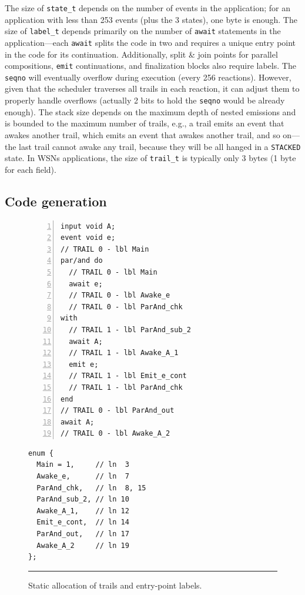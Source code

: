 \documentclass{sigplanconf}
\newcommand{\code}[1] {{\small{\texttt{#1}}}}
\newcommand{\1}{\;}
\newcommand{\2}{\;\;}
\newcommand{\3}{\;\;\;}
\newcommand{\5}{\;\;\;\;\;}
\begin{document}
The size of \code{state\_t} depends on the number of events in the application;
for an application with less than 253 events (plus the 3 states), one byte is 
enough.
%
The size of \code{label\_t} depends primarily on the number of \code{await} 
statements in the application---each \code{await} splits the code in two and 
requires a unique entry point in the code for its continuation.
Additionally, split \& join points for parallel compositions, \code{emit} 
continuations, and finalization blocks also require labels.
%
The \code{seqno} will eventually overflow during execution (every 256 
reactions).
However, given that the scheduler traverses all trails in each reaction, it can 
adjust them to properly handle overflows (actually 2 bits to hold the 
\code{seqno} would be already enough).
%
The stack size depends on the maximum depth of nested emissions and is bounded 
to the maximum number of trails, e.g., a trail emits an event that awakes 
another trail, which emits an event that awakes another trail, and so on---the 
last trail cannot awake any trail, because they will be all hanged in a 
\code{STACKED} state.
%
In WSNs applications, the size of \code{trail\_t} is typically only 3 bytes (1 
byte for each field).

\subsection{Code generation}

\begin{figure}[t]
\begin{minipage}[t]{0.55\linewidth}
\begin{lstlisting}[numbers=left,xleftmargin=2em]
input void A;
event void e;
// TRAIL 0 - lbl Main
par/and do
  // TRAIL 0 - lbl Main
  await e;
  // TRAIL 0 - lbl Awake_e
  // TRAIL 0 - lbl ParAnd_chk
with
  // TRAIL 1 - lbl ParAnd_sub_2
  await A;
  // TRAIL 1 - lbl Awake_A_1
  emit e;
  // TRAIL 1 - lbl Emit_e_cont
  // TRAIL 1 - lbl ParAnd_chk
end
// TRAIL 0 - lbl ParAnd_out
await A;
// TRAIL 0 - lbl Awake_A_2
\end{lstlisting}
\end{minipage}
%
\begin{minipage}[t]{0.45\linewidth}
\begin{lstlisting}
enum {
  Main = 1,     // ln  3
  Awake_e,      // ln  7
  ParAnd_chk,   // ln  8, 15
  ParAnd_sub_2, // ln 10
  Awake_A_1,    // ln 12
  Emit_e_cont,  // ln 14
  ParAnd_out,   // ln 17
  Awake_A_2     // ln 19
};
\end{lstlisting}
\end{minipage}
\rule{14cm}{0.37pt}
\caption{
Static allocation of trails and entry-point labels.
\label{lst.impl.trails}
}
\end{figure}
\end{document}
